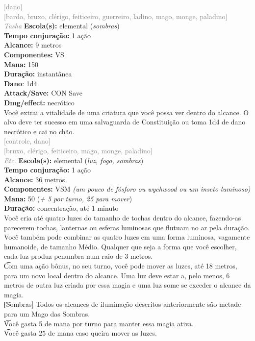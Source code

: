 \documentclass{RPG_Adventure}[2021/10/20]
\begin{document}
{\scriptsize \textcolor{gray}{[dano]\\}}
{\scriptsize \textcolor{gray}{[bardo, bruxo, clérigo, feiticeiro, guerreiro, ladino, mago, monge, paladino]\\}}
{\tiny \textcolor{gray}{\textit{Tasha}}}
{\small \t \textbf{Escola(s):} elemental (\textit{sombras})\\\t \textbf{Tempo conjuração:} 1 ação\\\t \textbf{Alcance:} 9 metros\\\t \textbf{Componentes:} VS\\\t \textbf{Mana:} 150\\\t \textbf{Duração:} instantânea\\\t \textbf{Dano}: 1d4\\\t \textbf{Attack/Save:} CON Save\\\t \textbf{Dmg/effect:} necrótico\\}
{\normalsize Você extrai a vitalidade de uma criatura que você possa ver dentro do alcance. O alvo deve ter sucesso em uma salvaguarda de Constituição ou toma 1d4 de dano necrótico e cai no chão.\\}
{\scriptsize \textcolor{gray}{[controle, dano]\\}}
{\scriptsize \textcolor{gray}{[bruxo, clérigo, feiticeiro, mago, monge, paladino]\\}}
{\tiny \textcolor{gray}{\textit{Etc.}}}
{\small \t \textbf{Escola(s):} elemental (\textit{luz, fogo, sombras})\\\t \textbf{Tempo conjuração:} 1 ação\\\t \textbf{Alcance:} 36 metros\\\t \textbf{Componentes:} VSM \textit{(um pouco de fósforo ou wychwood ou um inseto luminoso)}\\\t \textbf{Mana:} 50 (\textit{+ 5 por turno, 25 para mover})\\\t \textbf{Duração:} concentração, até 1 minuto\\}
{\normalsize Você cria até quatro luzes do tamanho de tochas dentro do alcance, fazendo-as parecerem tochas, lanternas ou esferas luminosas que flutuam no ar pela duração. Você também pode combinar as quatro luzes em uma forma luminosa, vagamente humanoide, de tamanho Médio. Qualquer que seja a forma que você escolher, cada luz produz penumbra num raio de 3 metros.\\\t Com uma ação bônus, no seu turno, você pode mover as luzes, até 18 metros, para um novo local dentro do alcance. Uma luz deve estar a, pelo menos, 6 metros de outra luz criada por essa magia e uma luz some se exceder o alcance da magia.\\\t [Sombras] Todos os alcances de iluminação descritos anteriormente são metade para um Mago das Sombras.\\\t Você gasta 5 de mana por turno para manter essa magia ativa.\\\t Você gasta 25 de mana caso queira mover as luzes.\\}
\end{document}
